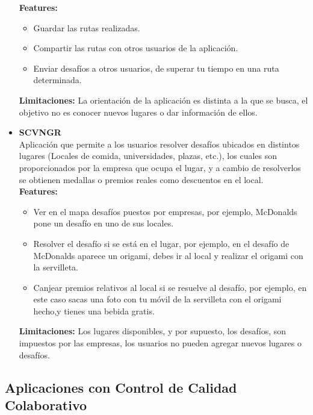 \documentclass[10pt,letterpaper]{article}
\begin{document}
\begin{itemize}
\textbf{Features:}
\begin{itemize}
\item Guardar las rutas realizadas.
\item Compartir las rutas con otros usuarios de la aplicación.
\item Enviar desafíos a otros usuarios, de superar tu tiempo en una ruta determinada.
\end{itemize}

\textbf{Limitaciones:} La orientación de la aplicación es distinta a la que se busca, el objetivo no es conocer nuevos lugares o dar información de ellos.\\

\item \textbf{SCVNGR}\\

Aplicación que permite a los usuarios resolver desafíos ubicados en distintos lugares (Locales de comida, universidades, plazas, etc.), los cuales son proporcionados por la empresa que ocupa el lugar, y a cambio de resolverlos se obtienen medallas o premios reales como descuentos en el local.\\

\textbf{Features:}
\begin{itemize}
\item Ver en el mapa desafíos puestos por empresas, por ejemplo, McDonalds pone un desafío en uno de sus locales. 
\item Resolver el desafío si se está en el lugar, por ejemplo, en el desafío de McDonalds aparece un origami, debes ir al local y realizar el origami con la servilleta.
\item Canjear premios relativos al local si se resuelve al desafío, por ejemplo, en este caso sacas una foto con tu móvil de la servilleta con el origami hecho,y tienes una bebida gratis.
\end{itemize}
\textbf{Limitaciones:} Los lugares disponibles, y por supuesto, los desafíos, son impuestos por las empresas, los usuarios no pueden agregar nuevos lugares o desafíos.
\end{itemize}

\subsection{Aplicaciones con Control de Calidad Colaborativo}
\end{document}
